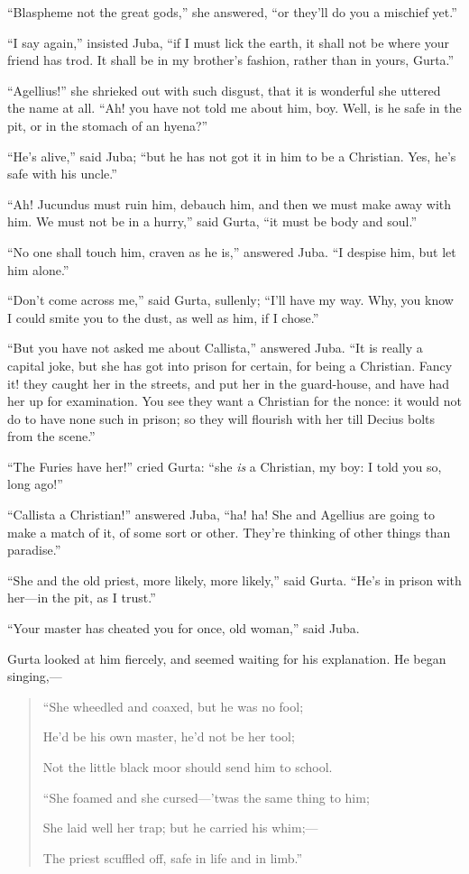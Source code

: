 ``Blaspheme not the great gods,'' she answered, ``or
they'll do you a mischief yet.''

``I say again,'' insisted Juba, ``if I must lick the
earth, it shall not be where your friend has trod. It shall be in my
brother's fashion, rather than in yours, Gurta.''

``Agellius!'' she shrieked out with such disgust, that it
is wonderful she uttered the name at all. ``Ah! you have not told
me about him, boy. Well, is he safe in the pit, or in the stomach of
an hyena?''

``He's alive,'' said Juba; ``but he has not got it in
him to be a Christian. Yes, he's safe with his uncle.''

``Ah! Jucundus must ruin him, debauch him, and then we must
make away with him. We must not be in a hurry,'' said Gurta,
``it must be body and soul.''

``No one shall touch him, craven as he is,'' answered Juba.
``I despise him, but let him alone.''

``Don't come across me,'' said Gurta, sullenly; ``I'll
have my way. Why, you know I could smite you to the dust, as well as
him, if I chose.''

``But you have not asked me about Callista,'' answered
Juba. ``It is really a capital joke, but she has got into prison
for certain, for being a Christian. Fancy it! they caught her in the
streets, and put her in the guard-house, and have had her up for
examination. You see they want a Christian for the nonce: it would not
do to have none such in prison; so they will flourish with her till
Decius bolts from the scene.''

``The Furies have her!'' cried Gurta: ``she \emph{is} a
Christian, my boy: I told you so, long ago!''

``Callista a Christian!'' answered Juba, ``ha! ha! She
and Agellius are going to make a match of it, of some sort or other.
They're thinking of other things than paradise.''

``She and the old priest, more likely, more likely,'' said
Gurta. ``He's in prison with her—in the pit, as I trust.''

``Your master has cheated you for once, old woman,'' said
Juba.

Gurta looked at him fiercely, and seemed waiting for his
explanation. He began singing,—

\begin{quote}

``She wheedled and coaxed, but he was no fool;

He'd be his own master, he'd not be her tool;

Not the little black moor should send him to school.

``She foamed and she cursed—'twas the same thing to him;

She laid well her trap; but he carried his whim;—

The priest scuffled off, safe in life and in limb.''

\end{quote}


